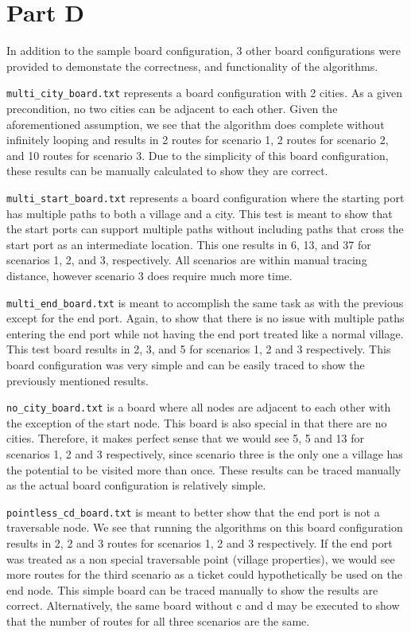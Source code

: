 \documentclass[12pt]{article}
\begin{document}
\section*{Part D}

In addition to the sample board configuration, 3 other board configurations were provided to demonstate the correctness, and functionality of the algorithms.

\verb|multi_city_board.txt| represents a board configuration with 2 cities. As a given precondition, no two cities can be adjacent to each other. Given the aforementioned assumption, we see that the algorithm does complete without infinitely looping and results in 2 routes for scenario 1, 2 routes for scenario 2, and 10 routes for scenario 3. Due to the simplicity of this board configuration, these results can be manually calculated to show they are correct.

\verb|multi_start_board.txt| represents a board configuration where the starting port has multiple paths to both a village and a city. This test is meant to show that the start ports can support multiple paths without including paths that cross the start port as an intermediate location. This one results in 6, 13, and 37 for scenarios 1, 2, and 3, respectively. All scenarios are within manual tracing distance, however scenario 3 does require much more time.

\verb|multi_end_board.txt| is meant to accomplish the same task as with the previous except for the end port. Again, to show that there is no issue with multiple paths entering the end port while not having the end port treated like a normal village. This test board results in 2, 3, and 5 for scenarios 1, 2 and 3 respectively. This board configuration was very simple and can be easily traced to show the previously mentioned results.

\verb|no_city_board.txt| is a board where all nodes are adjacent to each other with the exception of the start node. This board is also special in that there are no cities. Therefore, it makes perfect sense that we would see 5, 5 and 13 for scenarios 1, 2 and 3 respectively, since scenario three is the only one a village has the potential to be visited more than once. These results can be traced manually as the actual board configuration is relatively simple.

\verb|pointless_cd_board.txt| is meant to better show that the end port is not a traversable node. We see that running the algorithms on this board configuration results in 2, 2 and 3 routes for scenarios 1, 2 and 3 respectively. If the end port was treated as a non special traversable point (village properties), we would see more routes for the third scenario as a ticket could hypothetically be used on the end node. This simple board can be traced manually to show the results are correct. Alternatively, the same board without c and d may be executed to show that the number of routes for all three scenarios are the same.
\end{document}
